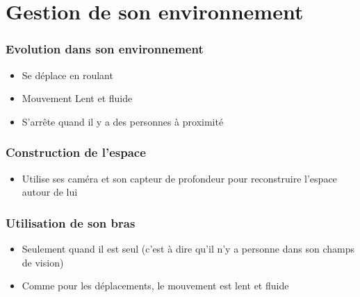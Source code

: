 \section{Gestion de son environnement}

\begin{frame}
  \frametitle{Evolution dans son environnement}
  \begin{itemize}
  \item Se déplace en roulant
  \item Mouvement Lent et fluide
  \item S'arrête quand il y a des personnes à proximité
  \end{itemize}
\end{frame}

\begin{frame}
  \frametitle{Construction de l'espace}
  \begin{itemize}
  \item Utilise ses caméra et son capteur de profondeur pour reconstruire
    l'espace autour de lui
  \end{itemize}
\end{frame}


\begin{frame}
  \frametitle{Utilisation de son bras}
  \begin{itemize}
  \item Seulement quand il est seul (c'est à dire qu'il n'y a personne
    dans son champs de vision)
  \item Comme pour les déplacements, le mouvement est lent et fluide
  \end{itemize}
\end{frame}


